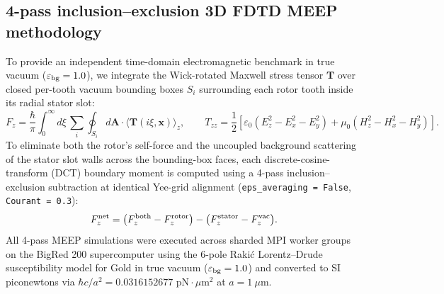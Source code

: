\documentclass[11pt,letterpaper]{article}
\begin{document}
\subsection*{4-pass inclusion--exclusion 3D FDTD MEEP methodology}
To provide an independent time-domain electromagnetic benchmark in true vacuum ($\varepsilon_{\rm bg}=1.0$), we integrate the Wick-rotated Maxwell stress tensor $\mathbf{T}$ over closed per-tooth vacuum bounding boxes $S_i$ surrounding each rotor tooth inside its radial stator slot\cite{oskooi2010,rodriguez2011}:
\begin{equation}
F_z = \frac{\hbar}{\pi} \int_0^\infty d\xi \, \sum_{i} \oint_{S_i} d\mathbf{A} \cdot \langle \mathbf{T}(i\xi, \mathbf{x}) \rangle_z,
\qquad
T_{zz} = \frac{1}{2} \left[ \varepsilon_0 (E_z^2 - E_x^2 - E_y^2) + \mu_0 (H_z^2 - H_x^2 - H_y^2) \right].
\label{eq:methods_fdtd}
\end{equation}
To eliminate both the rotor's self-force and the uncoupled background scattering of the stator slot walls across the bounding-box faces, each discrete-cosine-transform (DCT) boundary moment is computed using a 4-pass inclusion--exclusion subtraction at identical Yee-grid alignment (\texttt{eps\_averaging = False}, \texttt{Courant = 0.3}):
\begin{equation}
F_z^{\rm net} = \bigl(F_z^{\rm both} - F_z^{\rm rotor}\bigr) - \bigl(F_z^{\rm stator} - F_z^{\rm vac}\bigr).
\label{eq:methods_four_pass}
\end{equation}
All 4-pass MEEP simulations were executed across sharded MPI worker groups on the BigRed 200 supercomputer using the 6-pole Raki\'c Lorentz--Drude susceptibility model for Gold in true vacuum ($\varepsilon_{\rm bg}=1.0$) and converted to SI piconewtons via $\hbar c / a^2 = 0.0316152677\text{ pN}\cdot\mu\text{m}^2$ at $a = 1\ \mu\text{m}$.
\end{document}
